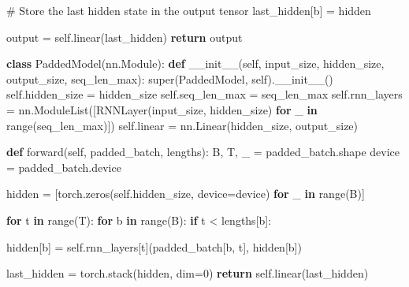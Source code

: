 \documentclass[
  letterpaper,
  DIV=11,
  numbers=noendperiod]{scrartcl}
\newenvironment{Shaded}{\begin{snugshade}}{\end{snugshade}}
\newcommand{\BuiltInTok}[1]{\textcolor[rgb]{0.00,0.23,0.31}{#1}}
\newcommand{\CommentTok}[1]{\textcolor[rgb]{0.37,0.37,0.37}{#1}}
\newcommand{\ControlFlowTok}[1]{\textcolor[rgb]{0.00,0.23,0.31}{\textbf{#1}}}
\newcommand{\DecValTok}[1]{\textcolor[rgb]{0.68,0.00,0.00}{#1}}
\newcommand{\FunctionTok}[1]{\textcolor[rgb]{0.28,0.35,0.67}{#1}}
\newcommand{\KeywordTok}[1]{\textcolor[rgb]{0.00,0.23,0.31}{\textbf{#1}}}
\newcommand{\NormalTok}[1]{\textcolor[rgb]{0.00,0.23,0.31}{#1}}
\newcommand{\OperatorTok}[1]{\textcolor[rgb]{0.37,0.37,0.37}{#1}}
\newcommand{\VariableTok}[1]{\textcolor[rgb]{0.07,0.07,0.07}{#1}}
\begin{document}
\begin{Shaded}
\begin{Highlighting}[]
            \CommentTok{\# Store the last hidden state in the output tensor}
\NormalTok{            last\_hidden[b] }\OperatorTok{=}\NormalTok{ hidden}

\NormalTok{        output }\OperatorTok{=} \VariableTok{self}\NormalTok{.linear(last\_hidden)}
        \ControlFlowTok{return}\NormalTok{ output}



\KeywordTok{class}\NormalTok{ PaddedModel(nn.Module):}
    \KeywordTok{def} \FunctionTok{\_\_init\_\_}\NormalTok{(}\VariableTok{self}\NormalTok{, input\_size, hidden\_size, output\_size, seq\_len\_max):}
        \BuiltInTok{super}\NormalTok{(PaddedModel, }\VariableTok{self}\NormalTok{).}\FunctionTok{\_\_init\_\_}\NormalTok{()}
        \VariableTok{self}\NormalTok{.hidden\_size }\OperatorTok{=}\NormalTok{ hidden\_size}
        \VariableTok{self}\NormalTok{.seq\_len\_max }\OperatorTok{=}\NormalTok{ seq\_len\_max}
        \VariableTok{self}\NormalTok{.rnn\_layers }\OperatorTok{=}\NormalTok{ nn.ModuleList([RNNLayer(input\_size, hidden\_size) }\ControlFlowTok{for}\NormalTok{ \_ }\KeywordTok{in} \BuiltInTok{range}\NormalTok{(seq\_len\_max)])}
        \VariableTok{self}\NormalTok{.linear }\OperatorTok{=}\NormalTok{ nn.Linear(hidden\_size, output\_size)}

    \KeywordTok{def}\NormalTok{ forward(}\VariableTok{self}\NormalTok{, padded\_batch, lengths):}
\NormalTok{        B, T, \_ }\OperatorTok{=}\NormalTok{ padded\_batch.shape}
\NormalTok{        device }\OperatorTok{=}\NormalTok{ padded\_batch.device}

\NormalTok{        hidden }\OperatorTok{=}\NormalTok{ [torch.zeros(}\VariableTok{self}\NormalTok{.hidden\_size, device}\OperatorTok{=}\NormalTok{device) }\ControlFlowTok{for}\NormalTok{ \_ }\KeywordTok{in} \BuiltInTok{range}\NormalTok{(B)]}

        \ControlFlowTok{for}\NormalTok{ t }\KeywordTok{in} \BuiltInTok{range}\NormalTok{(T):}
            \ControlFlowTok{for}\NormalTok{ b }\KeywordTok{in} \BuiltInTok{range}\NormalTok{(B):}
                \ControlFlowTok{if}\NormalTok{ t }\OperatorTok{\textless{}}\NormalTok{ lengths[b]:}

\NormalTok{                    hidden[b] }\OperatorTok{=} \VariableTok{self}\NormalTok{.rnn\_layers[t](padded\_batch[b, t], hidden[b])}

\NormalTok{        last\_hidden }\OperatorTok{=}\NormalTok{ torch.stack(hidden, dim}\OperatorTok{=}\DecValTok{0}\NormalTok{)}
        \ControlFlowTok{return} \VariableTok{self}\NormalTok{.linear(last\_hidden)}




\end{Highlighting}
\end{Shaded}
\end{document}
